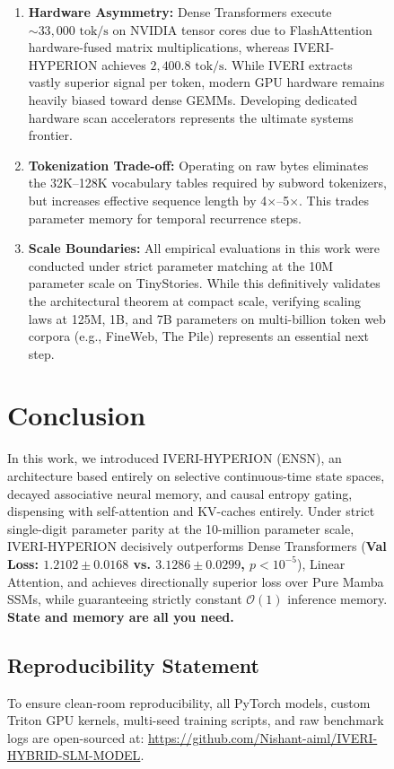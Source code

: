 \documentclass[10pt,twocolumn,letterpaper]{article}
\begin{document}
\begin{figure}[t]
\begin{enumerate}[leftmargin=*]
    \item \textbf{Hardware Asymmetry:} Dense Transformers execute $\sim 33,000\text{ tok/s}$ on NVIDIA tensor cores due to FlashAttention hardware-fused matrix multiplications, whereas IVERI-HYPERION achieves $2,400.8\text{ tok/s}$. While IVERI extracts vastly superior signal per token, modern GPU hardware remains heavily biased toward dense GEMMs. Developing dedicated hardware scan accelerators represents the ultimate systems frontier.
    \item \textbf{Tokenization Trade-off:} Operating on raw bytes eliminates the 32K–128K vocabulary tables required by subword tokenizers, but increases effective sequence length by 4$\times$–5$\times$. This trades parameter memory for temporal recurrence steps.
    \item \textbf{Scale Boundaries:} All empirical evaluations in this work were conducted under strict parameter matching at the 10M parameter scale on TinyStories. While this definitively validates the architectural theorem at compact scale, verifying scaling laws at 125M, 1B, and 7B parameters on multi-billion token web corpora (e.g., FineWeb, The Pile) represents an essential next step.
\end{enumerate}

\section{Conclusion}
\label{sec:conclusion}

In this work, we introduced IVERI-HYPERION (ENSN), an architecture based entirely on selective continuous-time state spaces, decayed associative neural memory, and causal entropy gating, dispensing with self-attention and KV-caches entirely. Under strict single-digit parameter parity at the 10-million parameter scale, IVERI-HYPERION decisively outperforms Dense Transformers (\textbf{Val Loss: $1.2102 \pm 0.0168$ vs. $3.1286 \pm 0.0299$, $p < 10^{-5}$}), Linear Attention, and achieves directionally superior loss over Pure Mamba SSMs, while guaranteeing strictly constant $\mathcal{O}(1)$ inference memory. \textbf{State and memory are all you need.}

\subsection*{Reproducibility Statement}
To ensure clean-room reproducibility, all PyTorch models, custom Triton GPU kernels, multi-seed training scripts, and raw benchmark logs are open-sourced at:
\url{https://github.com/Nishant-aiml/IVERI-HYBRID-SLM-MODEL}.


\end{figure}
\end{document}
